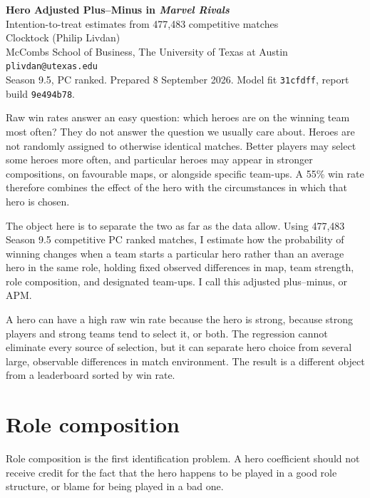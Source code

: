 \documentclass[11pt]{article}
\begin{document}
\begin{center}
{\Large\bfseries Hero Adjusted Plus--Minus in \emph{Marvel Rivals}}\\[4pt]
{\large Intention-to-treat estimates from 477,483 competitive matches}\\[10pt]
{\normalsize Clocktock (Philip Livdan)}\\[2pt]
{\small McCombs School of Business, The University of Texas at Austin}\\
{\small\texttt{plivdan@utexas.edu}}\\[8pt]
{\small Season 9.5, PC ranked. Prepared 8 September 2026. Model fit \texttt{31cfdff}, report build \texttt{9e494b78}.}
\end{center}

\vspace{4pt}
\noindent Raw win rates answer an easy question: which heroes are on the winning team most
often? They do not answer the question we usually care about. Heroes are not randomly assigned
to otherwise identical matches. Better players may select some heroes more often, and particular
heroes may appear in stronger compositions, on favourable maps, or alongside specific team-ups.
A 55\% win rate therefore combines the effect of the hero with the circumstances in which that
hero is chosen.

The object here is to separate the two as far as the data allow. Using 477,483 Season
9.5 competitive PC ranked matches, I estimate how the probability of winning changes when
a team starts a particular hero rather than an average hero in the same role, holding fixed
observed differences in map, team strength, role composition, and designated team-ups. I call
this adjusted plus--minus, or APM.

A hero can have a high raw win rate because the hero is strong, because strong players and strong
teams tend to select it, or both. The regression cannot eliminate every source of selection, but it
can separate hero choice from several large, observable differences in match environment. The
result is a different object from a leaderboard sorted by win rate.

\section*{Role composition}

Role composition is the first identification problem. A hero coefficient should not receive
credit for the fact that the hero happens to be played in a good role structure, or blame for
being played in a bad one.
\end{document}
